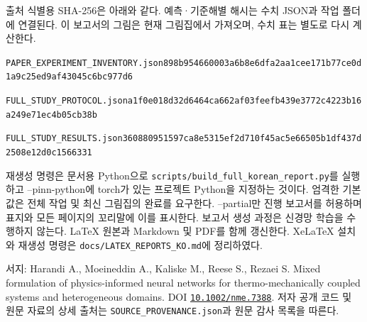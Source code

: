 \documentclass[10pt,a4paper]{article}
\begin{document}
{\small\color{muted} 출처 식별용 SHA-256은 아래와 같다. 예측·기준해별 해시는 수치 JSON과 작업 폴더에 연결된다. 이 보고서의 그림은 현재 그림집에서 가져오며, 수치 표는 별도로 다시 계산한다.\par}

{\small\color{muted} \nolinkurl{PAPER_EXPERIMENT_INVENTORY.json}\newline \nolinkurl{898b954660003a6b8e6dfa2aa1cee171b77ce0d1a9c25ed9af43045c6bc977d6}\par}

{\small\color{muted} \nolinkurl{FULL_STUDY_PROTOCOL.json}\newline \nolinkurl{a1f0e018d32d6464ca662af03feefb439e3772c4223b16a249e71ec4b05cb38b}\par}

{\small\color{muted} \nolinkurl{FULL_STUDY_RESULTS.json}\newline \nolinkurl{360880951597ca8e5315ef2d710f45ac5e66505b1df437d2508e12d0c1566331}\par}

재생성 명령은 문서용 Python으로 \nolinkurl{scripts/build_full_korean_report.py}를 실행하고 --pinn-python에 torch가 있는 프로젝트 Python을 지정하는 것이다. 엄격한 기본값은 전체 작업 및 최신 그림집의 완료를 요구한다. --partial만 진행 보고서를 허용하며 표지와 모든 페이지의 꼬리말에 이를 표시한다. 보고서 생성 과정은 신경망 학습을 수행하지 않는다. LaTeX 원본과 Markdown 및 PDF를 함께 갱신한다. XeLaTeX 설치와 재생성 명령은 \nolinkurl{docs/LATEX_REPORTS_KO.md}에 정리하였다.\par

{\small\color{muted} 서지: Harandi A., Moeineddin A., Kaliske M., Reese S., Rezaei S. Mixed formulation of physics-informed neural networks for thermo-mechanically coupled systems and heterogeneous domains. DOI \href{https://doi.org/10.1002/nme.7388}{\nolinkurl{10.1002/nme.7388}}. 저자 공개 코드 및 원문 자료의 상세 출처는 \nolinkurl{SOURCE_PROVENANCE.json}과 원문 감사 목록을 따른다.\par}
\end{document}
